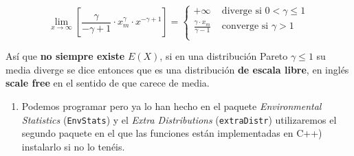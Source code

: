 \documentclass[
]{article}
\providecommand{\tightlist}{%
  \setlength{\itemsep}{0pt}\setlength{\parskip}{0pt}}
\begin{document}
\[
\lim_{x\to \infty} 
\left[
\frac{\gamma}{-\gamma+1}\cdot x_m^{\gamma} \cdot  x^{-\gamma+1}
\right]=
\left\{
\begin{array}{ll}
+\infty & \mbox{ diverge si }  0<\gamma\leq 1 \\
\frac{\gamma\cdot x_m}{\gamma-1}   & \mbox{ converge si } \gamma > 1\\
\end{array}
\right.
\]

Así que \textbf{no siempre existe} \(E(X)\), si en una distribución
Pareto \(\gamma\leq 1\) su media diverge se dice entonces que es una
distribución \textbf{de escala libre}, en inglés \textbf{scale free} en
el sentido de que carece de media.

\begin{enumerate}
\def\labelenumi{\alph{enumi})}
\setcounter{enumi}{4}
\tightlist
\item
  Podemos programar pero ya lo han hecho en el paquete
  \emph{Environmental Statistics} (\texttt{EnvStats}) y el \emph{Extra
  Distributions} (\texttt{extraDistr}) utilizaremos el segundo paquete
  en el que las funciones están implementadas en C++) instalarlo si no
  lo tenéis.
\end{enumerate}
\end{document}
